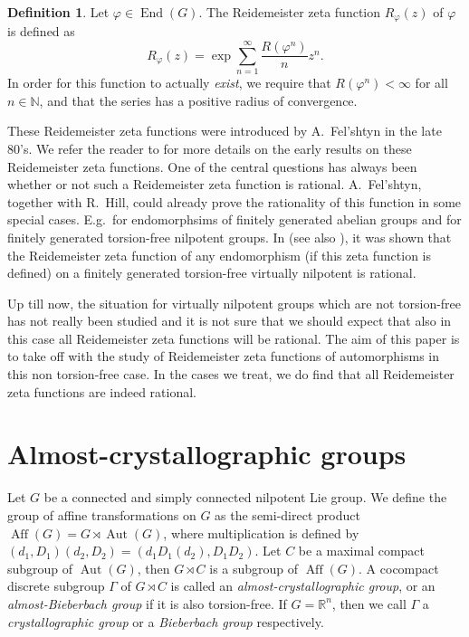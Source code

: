 \documentclass[a4paper]{article}
\theoremstyle{plain}
\theoremstyle{definition}
\newtheorem{defn}[theorem]{Definition}
\theoremstyle{remark}
\DeclareMathOperator{\End}{End}
\DeclareMathOperator{\Aut}{Aut}
\DeclareMathOperator{\Aff}{Aff}
\newcommand{\NN}{{\mathbb{N}}}
\newcommand{\RR}{{\mathbb{R}}}
\begin{document}
\begin{defn}
Let \(\varphi \in \End(G)\). The Reidemeister zeta function \(R_\varphi(z)\) of \(\varphi\) is defined as
\begin{equation*}
R_\varphi(z) = \exp \sum_{n=1}^{\infty} \frac{R(\varphi^n)}{n}z^n.
\end{equation*}
In order for this function to actually \emph{exist}, we require that \(R(\varphi^n) < \infty\) for all \(n \in \NN\), and that the series has a positive radius of convergence. 
\end{defn}

These Reidemeister zeta functions were introduced by A.~Fel'shtyn in  the late 80's. We refer the reader to \cite{fels00-2} for more details on the early results on these Reidemeister zeta functions. One of the central questions has always been whether or not such a Reidemeister zeta function is rational. A.~Fel'shtyn, together with R.~Hill, could already prove the rationality of this function in some special cases. E.g.\ for endomorphsims of finitely generated abelian groups and for finitely generated torsion-free nilpotent groups. In \cite{dd13-2} (see also \cite{fl15-1}), it was shown that the Reidemeister zeta function of any endomorphism (if this zeta function is defined) on a finitely generated torsion-free virtually nilpotent is rational. 

Up till now, the situation for virtually nilpotent groups which are not torsion-free has not really been studied and it is not sure that we should expect that also in this case all Reidemeister zeta functions will be rational. The aim of this paper is to take off with the study of Reidemeister zeta functions of automorphisms in this non torsion-free case. 
In the cases we treat, we do find that all Reidemeister zeta functions are indeed rational.

\section{Almost-crystallographic groups}
Let \(G\) be a connected and simply connected nilpotent Lie group. We define the group of affine transformations on \(G\) as the semi-direct product \(\Aff(G) = G \rtimes \Aut(G)\), where multiplication is defined by \((d_1,D_1)(d_2,D_2) = (d_1D_1(d_2),D_1D_2)\). 
Let \(C\) be a maximal compact subgroup of \(\Aut(G)\), then \(G \rtimes C\) is a subgroup of \(\Aff(G)\). A cocompact discrete subgroup \(\Gamma\) of \(G \rtimes C\) is called an \emph{almost-crystallographic group}, or an \emph{almost-Bieberbach group} if it is also torsion-free. If \(G = \RR^n\), then we call \(\Gamma\) a \emph{crystallographic group} or a \emph{Bieberbach group} respectively.
\end{document}
